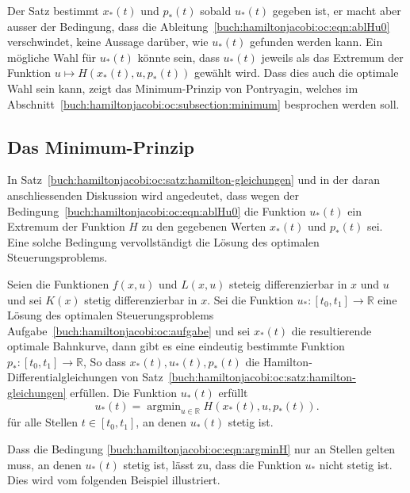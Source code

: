 Der Satz bestimmt $x_*(t)$ und $p_*(t)$ sobald $u_*(t)$ gegeben ist,
er macht aber ausser der Bedingung, dass die
Ableitung~\eqref{buch:hamiltonjacobi:oc:eqn:ablHu0} verschwindet,
keine Aussage darüber, wie $u_*(t)$ gefunden werden kann.
Ein mögliche Wahl für $u_*(t)$ könnte sein, dass $u_*(t)$ jeweils
als das Extremum der Funktion $u\mapsto H(x_*(t),u,p_*(t))$
gewählt wird.
Dass dies auch die optimale Wahl sein kann, zeigt das Minimum-Prinzip
von Pontryagin, welches im
Abschnitt~\ref{buch:hamiltonjacobi:oc:subsection:minimum}
besprochen werden soll.

%
%
\subsection{Das Minimum-Prinzip
\label{buch:hamiltonjacobi:oc:subsection:minimum}}
In Satz~\ref{buch:hamiltonjacobi:oc:satz:hamilton-gleichungen}
und in der daran anschliessenden Diskussion wird angedeutet, dass
wegen der Bedingung~\eqref{buch:hamiltonjacobi:oc:eqn:ablHu0}
die Funktion $u_*(t)$ ein Extremum der Funktion $H$ zu den gegebenen
Werten $x_*(t)$ und $p_*(t)$ sei.
Eine solche Bedingung vervollständigt die Lösung des optimalen
Steuerungsproblems.

\begin{satz}[Pontryagin]
Seien die Funktionen $f(x,u)$ und $L(x,u)$ steteig differenzierbar in 
$x$ und $u$ und sei $K(x)$ stetig differenzierbar in $x$.
Sei die Funktion $u_*\colon[t_0,t_1]\to\mathbb{R}$ eine Lösung des
optimalen Steuerungsproblems Aufgabe~\ref{buch:hamiltonjacobi:oc:aufgabe}
und sei $x_*(t)$ die resultierende optimale Bahnkurve, dann gibt es
eine eindeutig bestimmte Funktion $p_*\colon[t_0,t_1]\to\mathbb{R}$,
So dass $x_*(t),u_*(t),p_*(t)$ die Hamilton-Differentialgleichungen
von Satz~\ref{buch:hamiltonjacobi:oc:satz:hamilton-gleichungen}
erfüllen.
Die Funktion $u_*(t)$ erfüllt
\begin{equation}
u_*(t)
=
\operatorname{argmin}_{u\in\mathbb{R}} H(x_*(t),u,p_*(t)).
\label{buch:hamiltonjacobi:oc:eqn:argminH}
\end{equation}
für alle Stellen $t\in[t_0,t_1]$, an denen $u_*(t)$ stetig ist.
\end{satz}

Dass die Bedingung \eqref{buch:hamiltonjacobi:oc:eqn:argminH} nur
an Stellen gelten muss, an denen $u_*(t)$ stetig ist, lässt zu,
dass die Funktion $u_*$ nicht stetig ist.
Dies wird vom folgenden Beispiel illustriert.



